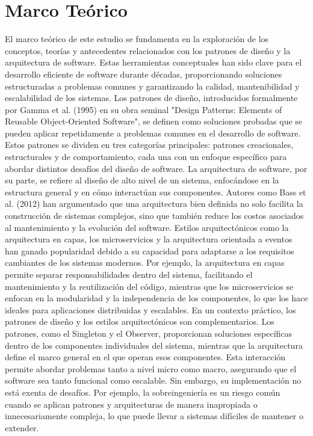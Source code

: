 \documentclass[conference]{IEEEtran}
\begin{document}
\section{Marco Te\'orico}
El marco teórico de este estudio se fundamenta en la exploración de los conceptos, teorías y antecedentes relacionados con los patrones de diseño y la arquitectura de software. Estas herramientas conceptuales han sido clave para el desarrollo eficiente de software durante décadas, proporcionando soluciones estructuradas a problemas comunes y garantizando la calidad, mantenibilidad y escalabilidad de los sistemas. Los patrones de diseño, introducidos formalmente por Gamma et al. (1995) en su obra seminal "Design Patterns: Elements of Reusable Object-Oriented Software", se definen como soluciones probadas que se pueden aplicar repetidamente a problemas comunes en el desarrollo de software. Estos patrones se dividen en tres categorías principales: patrones creacionales, estructurales y de comportamiento, cada una con un enfoque específico para abordar distintos desafíos del diseño de software.
La arquitectura de software, por su parte, se refiere al diseño de alto nivel de un sistema, enfocándose en la estructura general y en cómo interactúan sus componentes. Autores como Bass et al. (2012) han argumentado que una arquitectura bien definida no solo facilita la construcción de sistemas complejos, sino que también reduce los costos asociados al mantenimiento y la evolución del software. Estilos arquitectónicos como la arquitectura en capas, los microservicios y la arquitectura orientada a eventos han ganado popularidad debido a su capacidad para adaptarse a los requisitos cambiantes de los sistemas modernos. Por ejemplo, la arquitectura en capas permite separar responsabilidades dentro del sistema, facilitando el mantenimiento y la reutilización del código, mientras que los microservicios se enfocan en la modularidad y la independencia de los componentes, lo que los hace ideales para aplicaciones distribuidas y escalables.
En un contexto práctico, los patrones de diseño y los estilos arquitectónicos son complementarios. Los patrones, como el Singleton y el Observer, proporcionan soluciones específicas dentro de los componentes individuales del sistema, mientras que la arquitectura define el marco general en el que operan esos componentes. Esta interacción permite abordar problemas tanto a nivel micro como macro, asegurando que el software sea tanto funcional como escalable. Sin embargo, su implementación no está exenta de desafíos. Por ejemplo, la sobreingeniería es un riesgo común cuando se aplican patrones y arquitecturas de manera inapropiada o innecesariamente compleja, lo que puede llevar a sistemas difíciles de mantener o extender.
\end{document}
